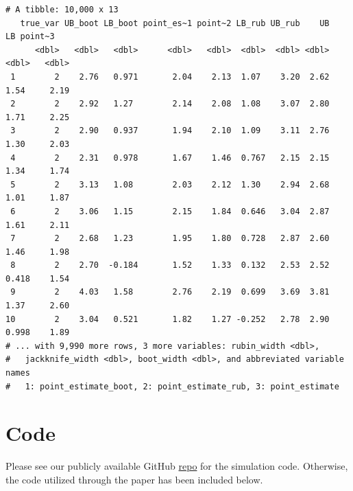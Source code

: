 \documentclass[
  letterpaper,
  DIV=11,
  numbers=noendperiod]{scrreprt}
\begin{document}
\begin{verbatim}
# A tibble: 10,000 x 13
   true_var UB_boot LB_boot point_es~1 point~2 LB_rub UB_rub    UB    LB point~3
      <dbl>   <dbl>   <dbl>      <dbl>   <dbl>  <dbl>  <dbl> <dbl> <dbl>   <dbl>
 1        2    2.76   0.971       2.04    2.13  1.07    3.20  2.62 1.54     2.19
 2        2    2.92   1.27        2.14    2.08  1.08    3.07  2.80 1.71     2.25
 3        2    2.90   0.937       1.94    2.10  1.09    3.11  2.76 1.30     2.03
 4        2    2.31   0.978       1.67    1.46  0.767   2.15  2.15 1.34     1.74
 5        2    3.13   1.08        2.03    2.12  1.30    2.94  2.68 1.01     1.87
 6        2    3.06   1.15        2.15    1.84  0.646   3.04  2.87 1.61     2.11
 7        2    2.68   1.23        1.95    1.80  0.728   2.87  2.60 1.46     1.98
 8        2    2.70  -0.184       1.52    1.33  0.132   2.53  2.52 0.418    1.54
 9        2    4.03   1.58        2.76    2.19  0.699   3.69  3.81 1.37     2.60
10        2    3.04   0.521       1.82    1.27 -0.252   2.78  2.90 0.998    1.89
# ... with 9,990 more rows, 3 more variables: rubin_width <dbl>,
#   jackknife_width <dbl>, boot_width <dbl>, and abbreviated variable names
#   1: point_estimate_boot, 2: point_estimate_rub, 3: point_estimate
\end{verbatim}

\hypertarget{code}{%
\section*{Code}\label{code}}

Please see our publicly available GitHub
\href{https://github.com/ieb2/jackknife_var_est.git}{repo} for the
simulation code. Otherwise, the code utilized through the paper has been
included below.
\end{document}
